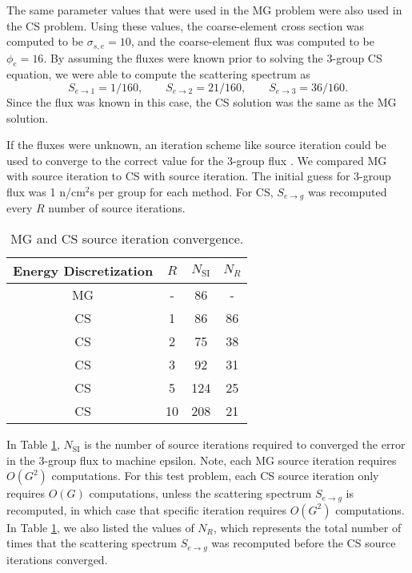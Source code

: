 \documentclass{anstrans}
\begin{document}
The same parameter values that were used in the MG problem were also used in the CS problem. Using these values, the coarse-element cross section was computed to be $\sigma_{s,e} = 10$, and the coarse-element flux was computed to be $\phi_e = 16$. By assuming the fluxes were known prior to solving the 3-group CS equation, we were able to compute the scattering spectrum as
\begin{equation*}
S_{e \to 1} = 1/160, \quad\quad S_{e \to 2} = 21/160, \quad\quad S_{e \to 3} = 36/160.
\end{equation*}
Since the flux was known in this case, the CS solution was the same as the MG solution. 

If the fluxes were unknown, an iteration scheme like source iteration could be used to converge to the correct value for the 3-group flux \cite{Spinks1967}. We compared MG with source iteration to CS with source iteration. The initial guess for 3-group flux was 1 n/cm$^2$s per group for each method. For CS, $S_{e \to g}$ was recomputed every $R$ number of source iterations. 
\begin{table}[htb]
\centering
  \caption{MG and CS source iteration convergence.}
  \begin{tabular}{cccc}
  Energy Discretization & $R$ & $N_\text{SI}$ & \textcolor[rgb]{0., 0.7, 0.35}{$N_R$} \\ \midrule
                     MG &  -  &     86        & \textcolor[rgb]{0., 0.7, 0.35}{-}  \\
                     CS &  1  &     86        & \textcolor[rgb]{0., 0.7, 0.35}{86} \\
                     CS &  2  &     75        & \textcolor[rgb]{0., 0.7, 0.35}{38} \\
                     CS &  3  &     92        & \textcolor[rgb]{0., 0.7, 0.35}{31} \\
                     CS &  5  &     124       & \textcolor[rgb]{0., 0.7, 0.35}{25} \\
                     CS &  10 &     208       & \textcolor[rgb]{0., 0.7, 0.35}{21} \\
\end{tabular}
  \label{Tab.SI}
\end{table}

\noindent In Table \ref{Tab.SI}, $N_\text{SI}$ is the number of source iterations required to converged the error in the 3-group flux to machine epsilon. Note, each MG source iteration requires $O(G^2)$ computations. For this test problem, each CS source iteration only requires $O(G)$ computations, unless the scattering spectrum $S_{e \to g}$ is recomputed, in which case that specific iteration requires $O(G^2)$ computations. In Table \ref{Tab.SI}, we also listed the values of $N_R$, which represents the total number of times that the scattering spectrum $S_{e \to g}$ was recomputed before the CS source iterations converged.
\end{document}
